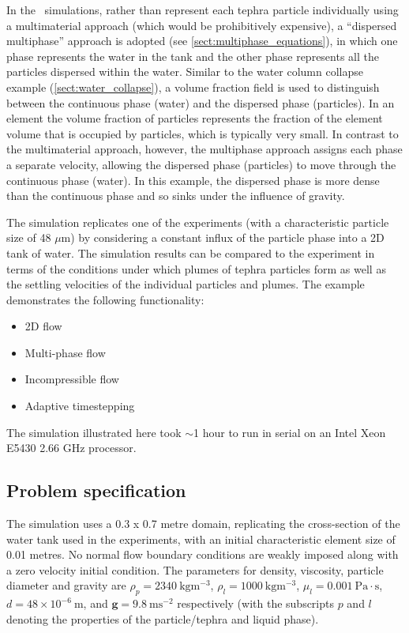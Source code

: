 In the \fluidity\ simulations, rather than represent each tephra particle individually using a multimaterial approach (which would be prohibitively expensive), a ``dispersed multiphase'' approach is adopted (see \ref{sect:multiphase_equations}), in which one phase represents the water in the tank and the other phase represents all the particles dispersed within the water. Similar to the water column collapse example (\ref{sect:water_collapse}), a volume fraction field is used to distinguish between the continuous phase (water) and the dispersed phase (particles). In an element the volume fraction of particles represents the fraction of the element volume that is occupied by particles, which is typically very small. In contrast to the multimaterial approach, however, the multiphase approach assigns each phase a separate velocity, allowing the dispersed phase (particles) to move through the continuous phase (water). In this example, the dispersed phase is more dense than the continuous phase and so sinks under the influence of gravity.

The simulation replicates one of the \cite{carey1997} experiments (with a characteristic particle size of 48 $\mu$m) by considering a constant influx of the particle phase into a 2D tank of water. The simulation results can be compared to the experiment in terms of the conditions under which plumes of tephra particles form as well as the settling velocities of the individual particles and plumes. The example demonstrates the following functionality:
\begin{itemize}
\item 2D flow
\item Multi-phase flow
\item Incompressible flow
\item Adaptive timestepping
\end{itemize}

The simulation illustrated here took $\sim$1 hour to run in serial on an Intel Xeon E5430 2.66 GHz processor.

\subsection{Problem specification}
The simulation uses a 0.3 x 0.7 metre domain, replicating the cross-section of the water tank used in the experiments, with an initial characteristic element size of 0.01 metres. No normal flow boundary conditions are weakly imposed along with a zero velocity initial condition. The parameters for density, viscosity, particle diameter and gravity are $\rho_p = 2340\ \mathrm{kgm^{-3}}$, $\rho_l = 1000\ \mathrm{kgm^{-3}}$, $\mu_l = 0.001\ \mathrm{Pa\cdot s}$, $d = 48\times 10^{-6}\ \mathrm{m}$, and $\mathbf{g} = 9.8\ \mathrm{ms^{-2}}$ respectively (with the subscripts $p$ and $l$ denoting the properties of the particle/tephra and liquid phase).

